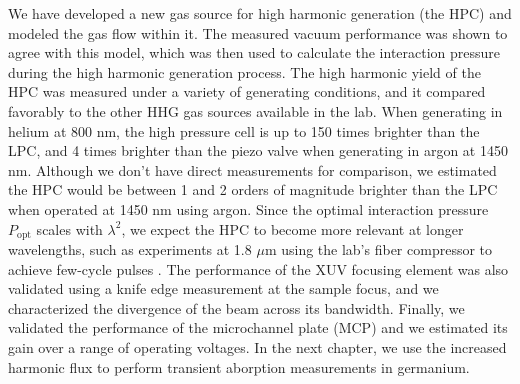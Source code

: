 We have developed a new gas source for high harmonic generation (the HPC) and modeled the gas flow within it. The measured vacuum performance was shown to agree with this model, which was then used to calculate the interaction pressure during the high harmonic generation process. The high harmonic yield of the HPC was measured under a variety of generating conditions, and it compared favorably to the other HHG gas sources available in the lab. When generating in helium at 800 nm, the high pressure cell is up to 150 times brighter than the LPC, and 4 times brighter than the piezo valve when generating in argon at 1450 nm. Although we don't have direct measurements for comparison, we estimated the HPC would be between 1 and 2 orders of magnitude brighter than the LPC when operated at 1450 nm using argon. Since the optimal interaction pressure  $P_{\textrm{opt}}$ scales with $\lambda^2$, we expect the HPC to become more relevant at longer wavelengths, such as experiments at 1.8 $\mu$m using the lab's fiber compressor to achieve few-cycle pulses \cite{gormanAttosecondProbingElectron2018}. The performance of the XUV focusing element was also validated using a knife edge measurement at the sample focus, and we characterized the divergence of the beam across its bandwidth. Finally, we validated the performance of the microchannel plate (MCP) and we estimated its gain over a range of operating voltages. In the next chapter, we use the increased harmonic flux to perform transient aborption measurements in germanium.
